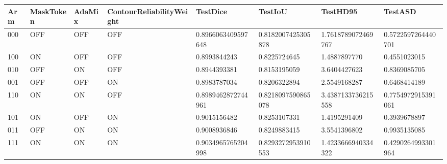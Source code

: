 \begin{tabular}{llllllll}
Arm & MaskToken & AdaMix & ContourReliabilityWeight & TestDice & TestIoU & TestHD95 & TestASD \\
\hline
000 & OFF & OFF & OFF & 0.8966063409597648 & 0.8182007425305878 & 1.7618789072469767 & 0.5722597264440701 \\
100 & ON & OFF & OFF & 0.8993844243 & 0.8225724645 & 1.4887897770 & 0.4551023015 \\
010 & OFF & ON & OFF & 0.8944393381 & 0.8153195059 & 3.6404427623 & 0.8369085705 \\
001 & OFF & OFF & ON & 0.8983787034 & 0.8206322894 & 2.5549168287 & 0.6468414189 \\
110 & ON & ON & OFF & 0.8989462872744961 & 0.8218097590865078 & 3.4387133736215558 & 0.7754972915391061 \\
101 & ON & OFF & ON & 0.9015156482 & 0.8253107331 & 1.4195291409 & 0.3939678897 \\
011 & OFF & ON & ON & 0.9008936846 & 0.8249883415 & 3.5541396802 & 0.9935135085 \\
111 & ON & ON & ON & 0.9034965765204998 & 0.8293272953910553 & 1.4233666940334322 & 0.4290264993301964 \\
\end{tabular}

